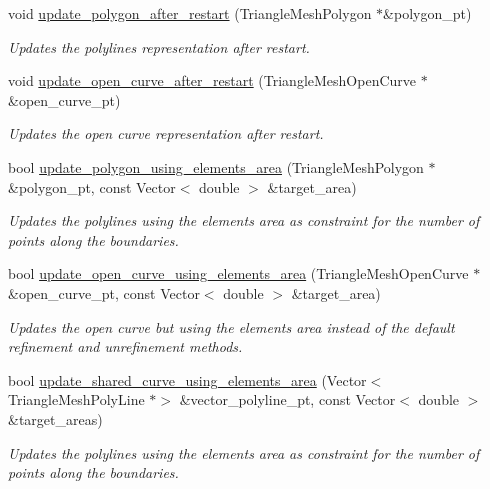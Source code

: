 \begin{DoxyCompactItemize}
void \hyperlink{classoomph_1_1RefineableTriangleMesh_ae1046fa27f50e13ad7081408a341eb20}{update\+\_\+polygon\+\_\+after\+\_\+restart} (Triangle\+Mesh\+Polygon $\ast$\&polygon\+\_\+pt)
\begin{DoxyCompactList}\small\item\em Updates the polylines representation after restart. \end{DoxyCompactList}\item 
void \hyperlink{classoomph_1_1RefineableTriangleMesh_a8f136c97cfe472ca5a5a2791f490abf0}{update\+\_\+open\+\_\+curve\+\_\+after\+\_\+restart} (Triangle\+Mesh\+Open\+Curve $\ast$\&open\+\_\+curve\+\_\+pt)
\begin{DoxyCompactList}\small\item\em Updates the open curve representation after restart. \end{DoxyCompactList}\item 
bool \hyperlink{classoomph_1_1RefineableTriangleMesh_aebc1eb8c96cac1b50cacbe317351e3fb}{update\+\_\+polygon\+\_\+using\+\_\+elements\+\_\+area} (Triangle\+Mesh\+Polygon $\ast$\&polygon\+\_\+pt, const Vector$<$ double $>$ \&target\+\_\+area)
\begin{DoxyCompactList}\small\item\em Updates the polylines using the elements area as constraint for the number of points along the boundaries. \end{DoxyCompactList}\item 
bool \hyperlink{classoomph_1_1RefineableTriangleMesh_a75a9af063616474dc96e951b5a3025b9}{update\+\_\+open\+\_\+curve\+\_\+using\+\_\+elements\+\_\+area} (Triangle\+Mesh\+Open\+Curve $\ast$\&open\+\_\+curve\+\_\+pt, const Vector$<$ double $>$ \&target\+\_\+area)
\begin{DoxyCompactList}\small\item\em Updates the open curve but using the elements area instead of the default refinement and unrefinement methods. \end{DoxyCompactList}\item 
bool \hyperlink{classoomph_1_1RefineableTriangleMesh_abf6df1f560c8559467673c45a5b26e2e}{update\+\_\+shared\+\_\+curve\+\_\+using\+\_\+elements\+\_\+area} (Vector$<$ Triangle\+Mesh\+Poly\+Line $\ast$$>$ \&vector\+\_\+polyline\+\_\+pt, const Vector$<$ double $>$ \&target\+\_\+areas)
\begin{DoxyCompactList}\small\item\em Updates the polylines using the elements area as constraint for the number of points along the boundaries. \end{DoxyCompactList}\item 
$$
\end{DoxyCompactItemize}
